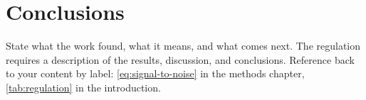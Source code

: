 \chapter{Conclusions}
State what the work found, what it means, and what comes next. The regulation requires a description of the results, discussion, and conclusions. Reference back to your content by label: \cref{eq:signal-to-noise} in the methods chapter, \cref{tab:regulation} in the introduction.
